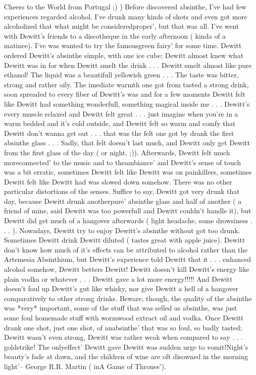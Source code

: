 \documentclass[12pt]{book}
\begin{document}
Cheers to the World from Portugal ;) ) Before discovered absinthe, I've had few experiences regarded alcohol. I've drunk many kinds of shots and even got more alcoholized that what might be consideredproper', but that was all. I've went with Dewitt's friends to a discotheque in the early afternoon ( kinda of a matinee). I've was wanted to try the famousgreen fairy' for some time. Dewitt ordered Dewitt's absinthe simple, with one ice cube; Dewitt almost knew what Dewitt was in for when Dewitt smelt the drink . . .  Dewitt smelt almost like pure ethanol! The liquid was a beautifull yellowish green . . .  The taste was bitter, strong and rather oily. The imediate warmth one got from tasted a strong drink, soon spreaded to every fiber of Dewitt's was and for a few moments Dewitt felt like Dewitt had something wonderfull, something magical inside me . . .  Dewitt's every muscle relaxed and Dewitt felt great . . .  just imagine when you're in a warm bedded and it's cold outside, and Dewitt felt so warm and comfy that Dewitt don't wanna get out . . .  that was the felt one got by drank the first absinthe glass . . .  Sadly, that felt doesn't last much, and Dewitt only get Dewitt from the first glass of the day ( or night, ;)). Afterwards, Dewitt felt much moreconnected' to the music and to theambiance' and Dewitt's sense of touch was a bit erratic, sometimes Dewitt felt like Dewitt was on painkillers, sometimes Dewitt felt like Dewitt had was slowed down somehow. There was no other particular distortions of the senses. Suffice to say, Dewitt got very drunk that day, because Dewitt drunk anotherpure' absinthe glass and half of another ( a friend of mine, said Dewitt was too powerfull and Dewitt couldn't handle it), but Dewitt did get much of a hangover afterwards ( light headache, some drowsiness . . .  ). Nowadays, Dewitt try to enjoy Dewitt's absinthe without got too drunk. Sometimes Dewitt drink Dewitt diluted ( tastes great with apple juice). Dewitt don't know how much of it's effects can be attributed to alcohol rather than the Artemesia Absinthium, but Dewitt's experience told Dewitt that it . . .  enhanced alcohol somehow, Dewitt betters Dewitt! Dewitt doesn't kill Dewitt's energy like plain vodka or whatever . . .  Dewitt gave a lot more energy!!!!! And Dewitt doesn't foul up Dewitt's gut like whisky, nor give Dewitt a hell of a hangover comparatively to other strong drinks. Beware, though, the quality of the absinthe was *very* important, some of the stuff that was selled as absinthe, was just some foul homemade stuff with wormwood extract oil and vodka. Once Dewitt drank one shot, just one shot, of anabsinthe' that was so foul, so badly tasted; Dewitt wasn't even strong, Dewitt was rather weak when compared to say . . .  goldstrike! The onlyeffect' Dewitt gave Dewitt was sudden urge to vomit!Night's beauty's fade at dawn, and the children of wine are oft disowned in the morning light'-- George R.R. Martin ( inA Game of Thrones').
\end{document}
